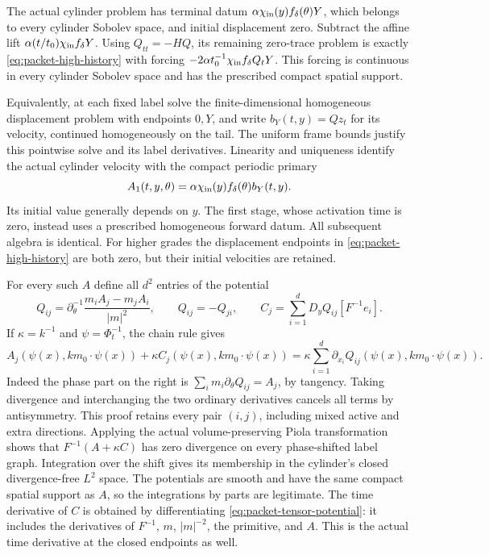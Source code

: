 The actual cylinder problem has terminal datum
$\alpha\chi_{\rm in}(y)f_\delta(\theta)Y$, which belongs to every
cylinder Sobolev space, and initial displacement zero. Subtract the
affine lift $\alpha(t/t_0)\chi_{\rm in}f_\delta Y$. Using
$Q_{tt}=-HQ$, its remaining zero-trace problem is exactly
\eqref{eq:packet-high-history} with forcing
$-2\alpha t_0^{-1}\chi_{\rm in}f_\delta Q_tY$. This forcing is
continuous in every cylinder Sobolev space and has the prescribed
compact spatial support.

Equivalently, at each fixed label solve the finite-dimensional homogeneous
displacement problem with endpoints $0,Y$, and write $b_Y(t,y)=Qz_t$
for its velocity, continued homogeneously on the tail. The uniform frame
bounds justify this pointwise solve and its label derivatives. Linearity
and uniqueness identify the actual cylinder velocity with the compact
periodic primary
\begin{equation}\label{eq:packet-joined-primary}
 A_1(t,y,\theta)=\alpha\chi_{\rm in}(y)f_\delta(\theta)b_Y(t,y).
\end{equation}
Its initial value generally depends on $y$. The first stage,
whose activation time is zero, instead uses a prescribed homogeneous
forward datum. All subsequent algebra is identical. For higher grades
the displacement endpoints in \eqref{eq:packet-high-history} are both
zero, but their initial velocities are retained.

For every such $A$ define all $d^2$ entries of the potential
\begin{equation}\label{eq:packet-tensor-potential}
 Q_{ij}=\partial_\theta^{-1}
       \frac{m_iA_j-m_jA_i}{|m|^2},\qquad Q_{ij}=-Q_{ji},
 \qquad
 C_j=\sum_{i=1}^d D_yQ_{ij}[F^{-1}e_i].
\end{equation}
If $\kappa=k^{-1}$ and $\psi=\Phi_t^{-1}$, the chain rule gives
\begin{equation}\label{eq:packet-pair-curl}
 A_j(\psi(x),km_0\cdot\psi(x))+
 \kappa C_j(\psi(x),km_0\cdot\psi(x))
 =\kappa\sum_{i=1}^d\partial_{x_i}
    Q_{ij}(\psi(x),km_0\cdot\psi(x)).
\end{equation}
Indeed the phase part on the right is
$\sum_i m_i\partial_\theta Q_{ij}=A_j$, by tangency.
Taking divergence and interchanging the two ordinary derivatives cancels
all terms by antisymmetry. This proof retains every pair $(i,j)$,
including mixed active and extra directions. Applying the actual
volume-preserving Piola transformation shows that
$F^{-1}(A+\kappa C)$ has zero divergence on every phase-shifted label
graph. Integration over the shift gives its membership in the cylinder's
closed divergence-free $L^2$ space. The potentials are smooth and have
the same compact spatial support as $A$, so the integrations by parts
are legitimate. The time derivative of $C$ is obtained by differentiating
\eqref{eq:packet-tensor-potential}: it includes the derivatives of $F^{-1}$,
$m$, $|m|^{-2}$, the primitive, and $A$. This is the actual time derivative
at the closed endpoints as well.

